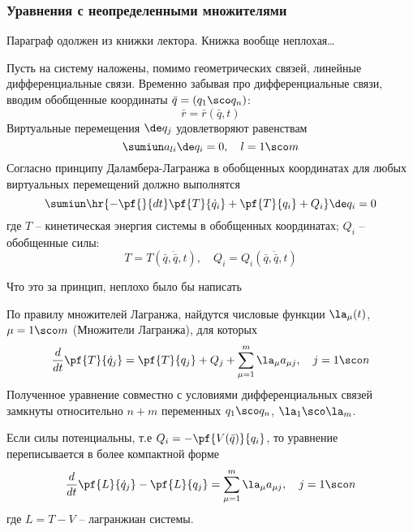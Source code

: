 \documentclass[a4paper,12pt]{article}
\begin{document}
\subsubsection{Уравнения с неопределенными множителями}
\begin{petit}
  Параграф одолжен из книжки лектора. Книжка вообще неплохая\dots
\end{petit}
Пусть на систему наложены, помимо геометрических связей, линейные
дифференциальные связи. Временно забывая про дифференциальные связи, вводим
обобщенные координаты $\bar q = (q_1\sco q_n)$:
\begin{displaymath}
  \bar r = \bar r(\bar q, t)
\end{displaymath}
Виртуальные перемещения $\de q_j$  удовлетворяют равенствам
\begin{displaymath}
  \sumiun a_{li}\de q_i = 0, \quad l = 1\sco m
\end{displaymath}
Согласно принципу Даламбера-Лагранжа в обобщенных координатах для
любых виртуальных перемещений должно выполнятся
\begin{displaymath}
  \sumiun \hr{-\pf{}{dt}\pf{T}{\dot q_i} + \pf{T}{q_i} + Q_i}\de q_i = 0
\end{displaymath}
где $T$ -- кинетическая энергия системы в обобщенных координатах; $Q_i$ -- обобщенные силы:
\begin{displaymath}
  T = T(\bar q, \dot{\bar q}, t), \quad Q_i = Q_i(\bar q, \dot{\bar q}, t)
\end{displaymath}
\begin{petit}
  Что это за принцип, неплохо было бы написать
\end{petit}
По правилу множителей Лагранжа,  найдутся
числовые функции $\la_\mu(t)$, $\mu = 1\sco m$ (Множители Лагранжа), для которых
\begin{equation}
\label{diff:lagr}
\frac{d}{dt}\pf{T}{\dot q_j} = \pf{T}{q_j} + Q_j + \sum_{\mu=1}^m \la_\mu a_{\mu j}, \quad j = 1\sco n
\end{equation}
Полученное уравнение совместно с условиями дифференциальных связей
замкнуты относительно $n+m$ переменных $q_1\sco q_n$, $\la_1\sco \la_m$.

Если силы потенциальны, т.е $\displaystyle Q_i = -\pf{V(\bar q)}{q_i}$, то уравнение переписывается
в более компактной форме
\begin{equation}
  \frac{d}{dt}\pf{L}{\dot q_j} - \pf{L}{q_j} = \sum_{\mu=1}^m \la_\mu a_{\mu j}, \quad j=1\sco n
\end{equation}
где $L=T-V$ -- лагранжиан системы.
\end{document}

